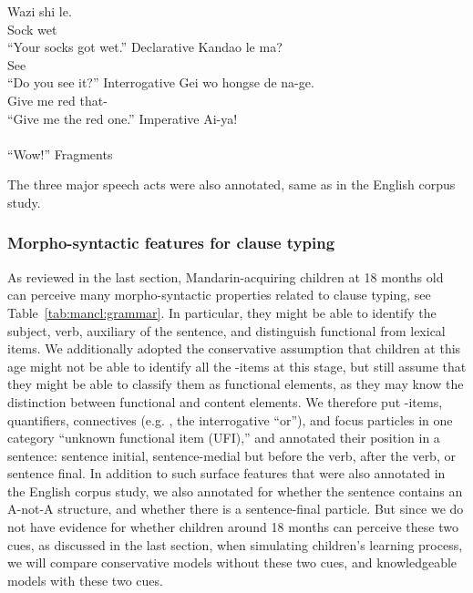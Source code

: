 \bxl \label{ex:mancl:annt:cl:dec}
\gll Wazi shi le.\\
Sock wet \Sfp{}\\
``Your socks got wet.'' \hfill Declarative
\ex \label{ex:mancl:annt:cl:int}
\gll Kandao le ma?\\
See \Asp{} \Sfp{}\\
\trans``Do you see it?''  \hfill Interrogative
\ex \label{ex:mancl:annt:cl:imp}
\gll Gei wo hongse de na-ge.\\
Give me red  that-\Cl{}\\
\trans``Give me the red one.'' \hfill Imperative
\ex \label{ex:mancl:annt:cl:frag}
\gll Ai-ya!\\
 \\
\trans ``Wow!'' \hfill Fragments
\exl
\eex

The three major speech acts were also annotated, same as in the English corpus study.

\subsubsection{Morpho-syntactic features for clause typing}

As reviewed in the last section, Mandarin-acquiring children at 18 months old can perceive many morpho-syntactic properties related to clause typing, see Table~\ref{tab:mancl:grammar}. In particular, they might be able to identify the subject, verb, auxiliary of the sentence, and distinguish functional from lexical items. We additionally adopted the conservative assumption that children at this age might not be able to identify all the \twh-items at this stage, but still assume that they might be able to classify them as functional elements, as they may know the distinction between functional and content elements. We therefore put \twh-items, quantifiers, connectives (e.g. , the interrogative ``or''), and focus particles in one category ``unknown functional item (UFI),'' and annotated their position in a sentence: sentence initial, sentence-medial but before the verb, after the verb, or sentence final. In addition to such surface features that were also annotated in the English corpus study, we also annotated for whether the sentence contains an A-not-A structure, and whether there is a sentence-final  particle. But since we do not have evidence for whether children around 18 months can perceive these two cues, as discussed in the last section, when simulating children's learning process, we will compare conservative models without these two cues, and knowledgeable models with these two cues.


